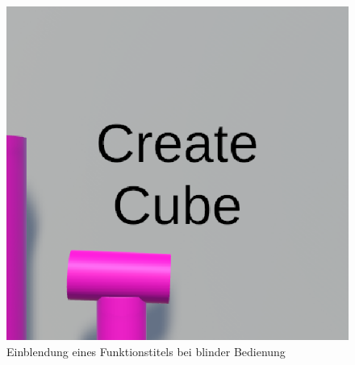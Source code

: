 \begin{figure}[h]
\captionsetup{width=.7\linewidth}
\includegraphics[scale=0.5]{Bilder/Hauptteil/Bearbeitet/Blind}
\centering
\caption{Einblendung eines Funktionstitels bei blinder Bedienung}
\label{fig:blind}
\end{figure}

